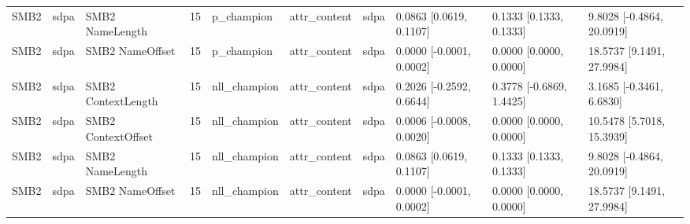 \begin{tabular}{llllllllll}
SMB2 & sdpa & SMB2 NameLength & 15 & p\_champion & attr\_content & sdpa & 0.0863 [0.0619, 0.1107] & 0.1333 [0.1333, 0.1333] & 9.8028 [-0.4864, 20.0919] \\
SMB2 & sdpa & SMB2 NameOffset & 15 & p\_champion & attr\_content & sdpa & 0.0000 [-0.0001, 0.0002] & 0.0000 [0.0000, 0.0000] & 18.5737 [9.1491, 27.9984] \\
SMB2 & sdpa & SMB2 ContextLength & 15 & nll\_champion & attr\_content & sdpa & 0.2026 [-0.2592, 0.6644] & 0.3778 [-0.6869, 1.4425] & 3.1685 [-0.3461, 6.6830] \\
SMB2 & sdpa & SMB2 ContextOffset & 15 & nll\_champion & attr\_content & sdpa & 0.0006 [-0.0008, 0.0020] & 0.0000 [0.0000, 0.0000] & 10.5478 [5.7018, 15.3939] \\
SMB2 & sdpa & SMB2 NameLength & 15 & nll\_champion & attr\_content & sdpa & 0.0863 [0.0619, 0.1107] & 0.1333 [0.1333, 0.1333] & 9.8028 [-0.4864, 20.0919] \\
SMB2 & sdpa & SMB2 NameOffset & 15 & nll\_champion & attr\_content & sdpa & 0.0000 [-0.0001, 0.0002] & 0.0000 [0.0000, 0.0000] & 18.5737 [9.1491, 27.9984] \\
\hline
\end{tabular}
